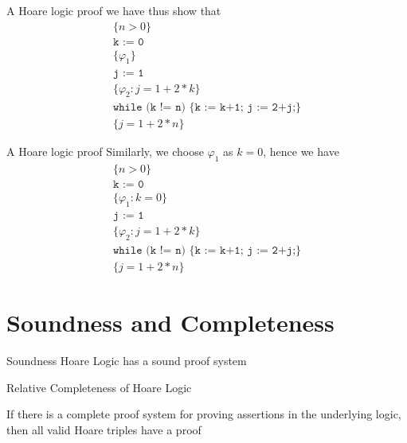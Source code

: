 \documentclass[presentation]{beamer}
\begin{document}
\begin{frame}[label={sec:orgf2c3c6b}]{A Hoare logic proof}
we have thus show that
\begin{gather*}
\{n>0\}\\
\texttt{k := 0}\\
\{\varphi_1\}\\
\texttt{j := 1}\\
\{\varphi_2:j=1+2*k\}\\
\texttt{while (k != n) \{k := k+1; j := 2+j;\}}\\
\{j=1+2*n\}
\end{gather*}
\end{frame}
\begin{frame}[label={sec:orgd330970}]{A Hoare logic proof}
Similarly, we choose \(\varphi_1\) as \(k=0\), hence we have
\begin{gather*}
\{n>0\}\\
\texttt{k := 0}\\
\{\varphi_1:k=0\}\\
\texttt{j := 1}\\
\{\varphi_2:j=1+2*k\}\\
\texttt{while (k != n) \{k := k+1; j := 2+j;\}}\\
\{j=1+2*n\}
\end{gather*}
\end{frame}
\section{Soundness and Completeness}
\label{sec:orgea99f67}
\begin{frame}[label={sec:orgc68dd73}]{Soundness}
Hoare Logic has a sound proof system
\end{frame}
\begin{frame}[label={sec:orgc5bad14}]{Relative Completeness of Hoare Logic}
\begin{theorem}[Cook, 1974]
If there is a complete proof system for proving assertions in the underlying logic, then all
valid Hoare triples have a proof
\end{theorem}
\end{frame}
\end{document}
